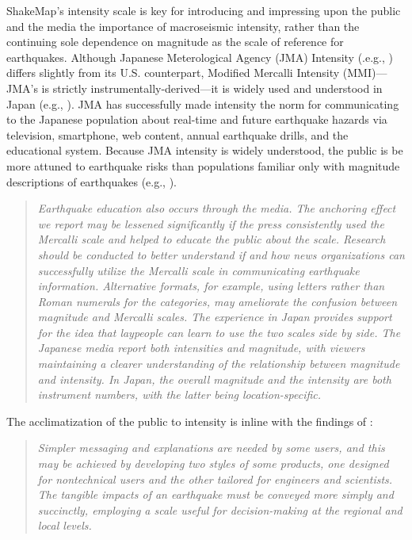\documentclass[letterpaper,10pt,english]{sphinxmanual}
\begin{document}
ShakeMap's intensity scale is key for introducing and impressing upon the public and
the media the importance of macroseismic intensity, rather than the continuing
sole dependence on magnitude as the scale of reference for earthquakes. Although
Japanese Meterological Agency (JMA) Intensity (.e.g., {\hyperref[references:jma1996]{}}) differs slightly from its U.S. counterpart, Modified Mercalli Intensity (MMI)---JMA's is strictly
instrumentally-derived---it is widely used and understood in Japan (e.g.,
{\hyperref[references:celsi2005]{}}). JMA has successfully made intensity the
norm for communicating to the Japanese population about real-time and future
earthquake hazards via television, smartphone, web content, annual earthquake
drills, and the educational system. Because JMA intensity is widely understood,
the public is be more attuned to earthquake risks than populations familiar only
with magnitude descriptions of earthquakes (e.g., {\hyperref[references:celsi2005]{}}).
\begin{quote}

\emph{Earthquake education also occurs through the media. The anchoring effect we
report may be lessened significantly if the press consistently used the Mercalli
scale and helped to educate the public about the scale. Research should be
conducted to better understand if and how news organizations can successfully
utilize the Mercalli scale in communicating earthquake information. Alternative
formats, for example, using letters rather than Roman numerals for the
categories, may ameliorate the confusion between magnitude and Mercalli scales.
The experience in Japan provides support for the idea that laypeople can learn
to use the two scales side by side. The Japanese media report both intensities
and magnitude, with viewers maintaining a clearer understanding of the
relationship between magnitude and intensity. In Japan, the overall magnitude
and the intensity are both instrument numbers, with the latter being
location-specific.}
\end{quote}

The acclimatization of the public to intensity is inline with the findings of
{\hyperref[references:gomberg2013]{}}:
\begin{quote}

\emph{Simpler messaging and
explanations are needed by some users,
and this may be achieved by developing two styles of some products, one designed
for nontechnical users and the other tailored for engineers and scientists. The
tangible impacts of an earthquake must be conveyed more simply and succinctly,
employing a scale useful for decision-making at the regional and local levels.}
\end{quote}
\end{document}
